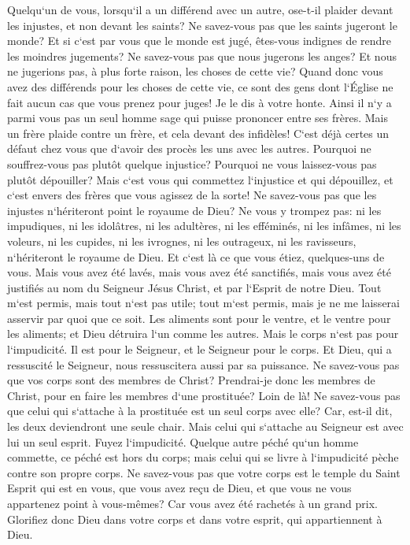 \verse Quelqu`un de vous, lorsqu`il a un différend avec un autre, ose-t-il plaider devant les injustes, et non devant les saints? 
\verse Ne savez-vous pas que les saints jugeront le monde? Et si c`est par vous que le monde est jugé, êtes-vous indignes de rendre les moindres jugements? 
\verse Ne savez-vous pas que nous jugerons les anges? Et nous ne jugerions pas, à plus forte raison, les choses de cette vie? 
\verse Quand donc vous avez des différends pour les choses de cette vie, ce sont des gens dont l`Église ne fait aucun cas que vous prenez pour juges! 
\verse Je le dis à votre honte. Ainsi il n`y a parmi vous pas un seul homme sage qui puisse prononcer entre ses frères. 
\verse Mais un frère plaide contre un frère, et cela devant des infidèles! 
\verse C`est déjà certes un défaut chez vous que d`avoir des procès les uns avec les autres. Pourquoi ne souffrez-vous pas plutôt quelque injustice? Pourquoi ne vous laissez-vous pas plutôt dépouiller? 
\verse Mais c`est vous qui commettez l`injustice et qui dépouillez, et c`est envers des frères que vous agissez de la sorte! 
\verse Ne savez-vous pas que les injustes n`hériteront point le royaume de Dieu? Ne vous y trompez pas: ni les impudiques, ni les idolâtres, ni les adultères, 
\verse ni les efféminés, ni les infâmes, ni les voleurs, ni les cupides, ni les ivrognes, ni les outrageux, ni les ravisseurs, n`hériteront le royaume de Dieu. 
\verse Et c`est là ce que vous étiez, quelques-uns de vous. Mais vous avez été lavés, mais vous avez été sanctifiés, mais vous avez été justifiés au nom du Seigneur Jésus Christ, et par l`Esprit de notre Dieu. 
\verse Tout m`est permis, mais tout n`est pas utile; tout m`est permis, mais je ne me laisserai asservir par quoi que ce soit. 
\verse Les aliments sont pour le ventre, et le ventre pour les aliments; et Dieu détruira l`un comme les autres. Mais le corps n`est pas pour l`impudicité. Il est pour le Seigneur, et le Seigneur pour le corps. 
\verse Et Dieu, qui a ressuscité le Seigneur, nous ressuscitera aussi par sa puissance. 
\verse Ne savez-vous pas que vos corps sont des membres de Christ? Prendrai-je donc les membres de Christ, pour en faire les membres d`une prostituée? 
\verse Loin de là! Ne savez-vous pas que celui qui s`attache à la prostituée est un seul corps avec elle? Car, est-il dit, les deux deviendront une seule chair. 
\verse Mais celui qui s`attache au Seigneur est avec lui un seul esprit. 
\verse Fuyez l`impudicité. Quelque autre péché qu`un homme commette, ce péché est hors du corps; mais celui qui se livre à l`impudicité pèche contre son propre corps. 
\verse Ne savez-vous pas que votre corps est le temple du Saint Esprit qui est en vous, que vous avez reçu de Dieu, et que vous ne vous appartenez point à vous-mêmes? 
\verse Car vous avez été rachetés à un grand prix. Glorifiez donc Dieu dans votre corps et dans votre esprit, qui appartiennent à Dieu. 

